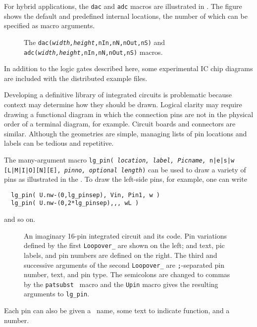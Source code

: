 For hybrid applications, the \verb|dac| and \verb|adc| macros are
illustrated in .
The figure shows the default and predefined internal locations, the number
of which can be specified as macro arguments.
\begin{figure}[ht]
   
   \caption{The {\tt dac({\sl width,height},nIn,nN,nOut,nS)}
   and {\tt adc({\sl width,height},nIn,nN,nOut,nS)} macros.}
   \label{Dac}
   \end{figure}

In addition to the logic gates described here, some experimental
IC chip diagrams are included with the distributed example files.

Developing a definitive library of integrated circuits is problematic
because context may determine how they should be drawn.  Logical clarity
may require drawing a functional diagram in which the connection pins are
not in the physical order of a terminal diagram, for example.  Circuit
boards and connectors are similar. Although the geometries are simple,
managing lists of pin locations and labels can be tedious and repetitive.

The many-argument macro
 {\tt lg\_pin( {\sl location, label, Picname,} n|e|s|w [L|M|I|O][N][E],
  {\sl pinno, optional length})}
can be used to draw a variety of pins as illustrated in the .
To draw the left-side pins, for example, one can write
\begin{verbatim}
  lg_pin( U.nw-(0,lg_pinsep), Vin, Pin1, w )
  lg_pin( U.nw-(0,2*lg_pinsep),,, wL )
\end{verbatim}
\noindent
and so on.
\begin{figure}[h!]
   \parbox{\textwidth}{\small}%
   \hfill\llap{\raise-0.15in\hbox{ }}%
   \vspace*{-\baselineskip}%
   \caption{ An imaginary 16-pin integrated circuit and its code.
    Pin variations defined by the first {\tt Loopover\_}
    are shown on the left; and text, pic labels, and pin
    numbers are defined on the right.
    The third and successive arguments of the second
    {\tt Loopover\_}
    are {\tt ;}-separated pin number, text, and pin type. The
    semicolons are changed to commas by the {\tt patsubst} \Mfour\ macro
    and the {\tt Upin} macro gives the resulting arguments to {\tt lg\_pin}.
\label{sampleIC}}%
   \end{figure}
Each pin can also be given a \pic\ name, some text
to indicate function, and a number.

